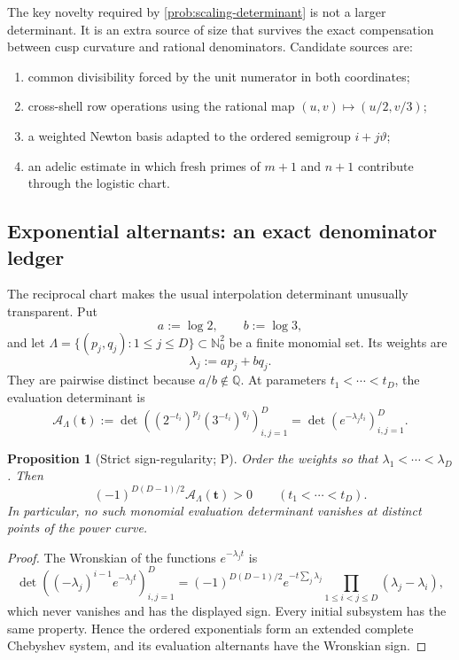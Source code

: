 \documentclass[10pt,oneside]{article}
\newtheorem{proposition}[theorem]{Proposition}
\theoremstyle{definition}
\theoremstyle{remark}
\newcommand{\Nzero}{\mathbb N_0}
\newcommand{\Q}{\mathbb Q}
\newcommand{\thetaq}{\vartheta}
\newcommand{\statusP}{\textsc{P}}
\begin{document}
The key novelty required by \cref{prob:scaling-determinant} is not a larger determinant.  It is an extra source of size that survives the exact compensation between cusp curvature and rational denominators.  Candidate sources are:
\begin{enumerate}
\item common divisibility forced by the unit numerator in both coordinates;
\item cross-shell row operations using the rational map \((u,v)\mapsto(u/2,v/3)\);
\item a weighted Newton basis adapted to the ordered semigroup \(i+j\thetaq\);
\item an adelic estimate in which fresh primes of \(m+1\) and \(n+1\) contribute through the logistic chart.
\end{enumerate}


\subsection{Exponential alternants: an exact denominator ledger}
The reciprocal chart makes the usual interpolation determinant unusually transparent.  Put
\[
 a:=\log 2,\qquad b:=\log 3,
\]
and let
\(
 \Lambda=\{(p_j,q_j):1\le j\le D\}\subset\Nzero^2
\)
be a finite monomial set.  Its weights are
\[
 \lambda_j:=ap_j+bq_j.
\]
They are pairwise distinct because \(a/b\notin\Q\).  At parameters
\(t_1<\cdots<t_D\), the evaluation determinant is
\begin{equation}
 \mathscr A_\Lambda(\bm t)
 :=\det\!\left((2^{-t_i})^{p_j}(3^{-t_i})^{q_j}\right)_{i,j=1}^D
 =\det\!\left(e^{-\lambda_jt_i}\right)_{i,j=1}^D.
\label{eq:exponential-alternant}
\end{equation}

\begin{proposition}[Strict sign-regularity; \statusP]
\label{prop:alternant-sign}
Order the weights so that \(\lambda_1<\cdots<\lambda_D\).  Then
\[
 (-1)^{D(D-1)/2}\mathscr A_\Lambda(\bm t)>0
 \qquad(t_1<\cdots<t_D).
\]
In particular, no such monomial evaluation determinant vanishes at distinct points of the power curve.
\end{proposition}

\begin{proof}
The Wronskian of the functions \(e^{-\lambda_jt}\) is
\[
 \det\left((-\lambda_j)^{i-1}e^{-\lambda_jt}\right)_{i,j=1}^D
 =(-1)^{D(D-1)/2}e^{-t\sum_j\lambda_j}
   \prod_{1\le i<j\le D}(\lambda_j-\lambda_i),
\]
which never vanishes and has the displayed sign.  Every initial subsystem has the same property.  Hence the ordered exponentials form an extended complete Chebyshev system, and its evaluation alternants have the Wronskian sign.
\end{proof}
\end{document}

